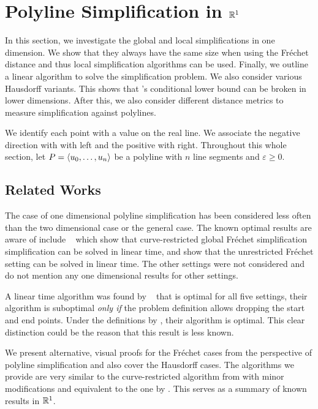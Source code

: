 \section{Polyline Simplification in \(\mathbb{R}^1\)}\label{sec:dimension_one}
In this section, we investigate the global and local simplifications in one dimension. We show that they always have the same size when using the Fréchet distance and thus local simplification algorithms can be used. Finally, we outline a linear algorithm to solve the simplification problem. We also consider various Hausdorff variants. This shows that \citeauthor{polyline_simplification_has_cubic_complexity_bringmannetal}'s conditional lower bound can be broken in lower dimensions. After this, we also consider different distance metrics to measure simplification against polylines.

We identify each point with a value on the real line. We associate the negative direction with with left and the positive with right. Throughout this whole section, let \(P = \left\langle u_0, \dots, u_n\right\rangle\) be a polyline with \(n\) line segments and \(\varepsilon \geq 0\).

\subsection{Related Works}
The case of one dimensional polyline simplification has been considered less often than the two dimensional case or the general case. The known optimal results are aware of include \citeauthor{global_curve_simplification}~\cite{global_curve_simplification} which show that curve-restricted global Fréchet simplification simplification can be solved in linear time, and \citeauthor{min_complexity_1d_unrestricted}\cite{min_complexity_1d_unrestricted} show that the unrestricted Fréchet setting can be solved in linear time. The other settings were not considered and \citeauthor{global_curve_simplification} do not mention any one dimensional results for other settings. 

A linear time algorithm was found by \citeauthor{clustering_time_series}~\cite{clustering_time_series} that is optimal for all five settings, their algorithm is suboptimal \emph{only if} the problem definition allows dropping the start and end points. Under the definitions by \citeauthor{global_curve_simplification}, their algorithm is optimal. This clear distinction could be the reason that this result is less known.

We present alternative, visual proofs for the Fréchet cases from the perspective of polyline simplification and also cover the Hausdorff cases. The algorithms we provide are very similar to the curve-restricted algorithm from \citeauthor{global_curve_simplification} with minor modifications and equivalent to the one by \citeauthor{clustering_time_series}. This serves as a summary of known results in \(\mathbb{R}^1\).

